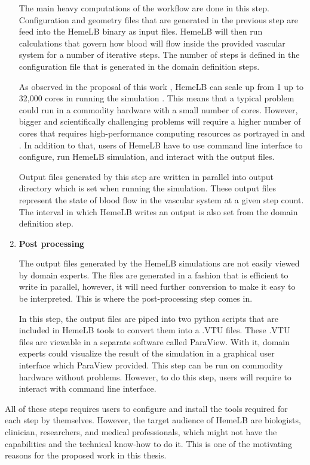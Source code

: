 \begin{enumerate}
The main heavy computations of the workflow are done in this step.  Configuration and geometry files that are generated in the previous step are feed into the HemeLB binary as input files. HemeLB will then run calculations that govern how blood will flow inside the provided vascular system for a number of iterative steps. The number of steps is defined in the configuration file that is generated in the domain definition steps. 

As observed in the proposal of this work \citep{Steven:2016aa}, HemeLB can scale up from 1 up to 32,000 cores in running the simulation \citep{groen2013analysing}. This means that a typical problem could run in a commodity hardware with a small number of cores. However, bigger and scientifically challenging problems will require a higher number of cores that requires high-performance computing resources as portrayed in \cite{franco2016non, franco2015dynamic} and \cite{bernabeu2015characterization}. In addition to that, users of HemeLB have to use command line interface to configure, run HemeLB simulation, and interact with the output files. 

Output files generated by this step are written in parallel into output directory which is set when running the simulation. These output files represent the state of blood flow in the vascular system at a given step count. The interval in which HemeLB writes an output is also set from the domain definition step.

\item{\textbf{Post processing}}

The output files generated by the HemeLB simulations are not easily viewed by domain experts. The files are generated in a fashion that is efficient to write in parallel, however, it will need further conversion to make it easy to be interpreted. This is where the post-processing step comes in.  

In this step, the output files are piped into two python scripts that are included in HemeLB tools to convert them into a .VTU files. These .VTU files are viewable in a separate software called ParaView. With it, domain experts could visualize the result of the simulation in a graphical user interface which ParaView provided. This step can be run on commodity hardware without problems. However, to do this step, users will require to interact with command line interface.

\end{enumerate}

All of these steps requires users to configure and install the tools required for each step by themselves. However, the target audience of HemeLB are biologists, clinician, researchers, and medical professionals, which might not have the capabilities and the technical know-how to do it. This is one of the motivating reasons for the proposed work in this thesis.



